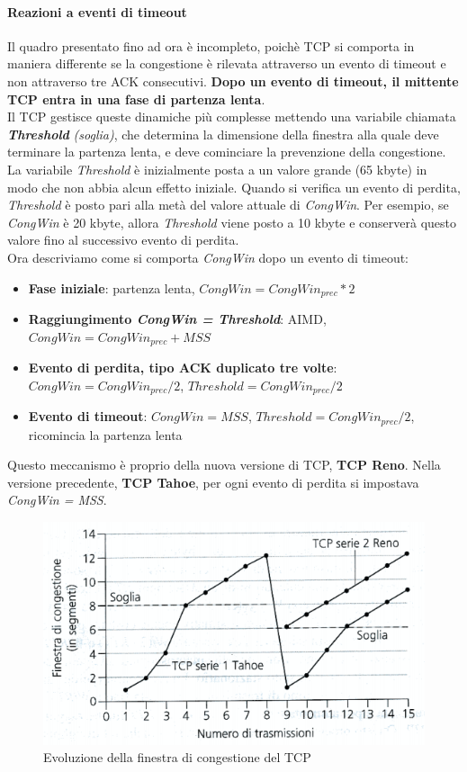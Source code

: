 \documentclass[11pt,a4paper]{article}
\begin{document}
\paragraph{Reazioni a eventi di timeout}
Il quadro presentato fino ad ora è incompleto, poichè TCP si comporta in maniera differente se la congestione è rilevata attraverso un evento di timeout e non attraverso tre ACK consecutivi. \textbf{Dopo un evento di timeout, il mittente TCP entra in una fase di partenza lenta}. \\
Il TCP gestisce queste dinamiche più complesse mettendo una variabile chiamata \textbf{\emph{Threshold}} \textit{(soglia)}, che determina la dimensione della finestra alla quale deve terminare la partenza lenta, e deve cominciare la prevenzione della congestione. La variabile \emph{Threshold} è inizialmente posta a un valore grande (65 kbyte) in modo che non abbia alcun effetto iniziale. Quando si verifica un evento di perdita, \emph{Threshold} è posto pari alla metà del valore attuale di \emph{CongWin}. Per esempio, se \emph{CongWin} è 20 kbyte, allora \emph{Threshold} viene posto a 10 kbyte e conserverà questo valore fino al successivo evento di perdita. \\
Ora descriviamo come si comporta \emph{CongWin} dopo un evento di timeout:
\begin{itemize}
	\item \textbf{Fase iniziale}: partenza lenta, $CongWin = CongWin_{prec}*2$
	\item \textbf{Raggiungimento \emph{CongWin = Threshold}}: AIMD, $CongWin = CongWin_{prec} + MSS$
	\item \textbf{Evento di perdita, tipo ACK duplicato tre volte}: $CongWin = CongWin_{prec}/2$, $Threshold = CongWin_{prec}/2$
	\item \textbf{Evento di timeout}: $CongWin = MSS$, $Threshold = CongWin_{prec}/2$, ricomincia la partenza lenta
\end{itemize}
Questo meccanismo è proprio della nuova versione di TCP, \textbf{TCP Reno}. Nella versione precedente, \textbf{TCP Tahoe}, per ogni evento di perdita si impostava \emph{CongWin = MSS}.
\begin{figure}
	\includegraphics[scale=0.6]{img/046.png}
	\caption{Evoluzione della finestra di congestione del TCP}
\end{figure}
\end{document}
